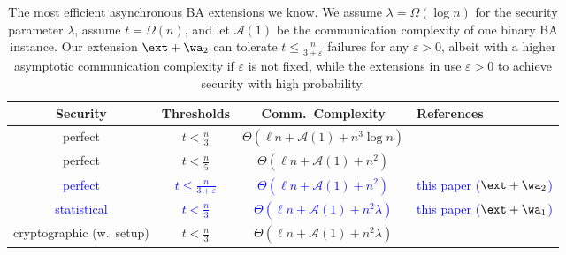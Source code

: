 \begin{table}[t] \begin{threeparttable}
    \setcellgapes{1pt}
    \caption{The most efficient asynchronous BA extensions we know. We assume $\lambda = \Omega(\log n)$ for the security parameter $\lambda$, assume $t = \Omega(n)$, and let $\mathcal{A}(1)$ be the communication complexity of one binary BA instance. Our \linebreak extension $\ext + \wa_2$ can tolerate $t \leq \frac{n}{3 + \varepsilon}$ failures for any $\varepsilon > 0$, albeit with a higher asymptotic communication complexity if $\varepsilon$ is not fixed, while the extensions in \cite{blln23, ck23} use $\varepsilon > 0$ to achieve security with high probability.}
    \makegapedcells
    \begin{tabularx}{1\linewidth}{|c|c|c|Y|} \hline
        \textbf{Security} & \textbf{Thresholds} & \textbf{Comm.\ Complexity} & \textbf{References} \\ \hline
        
        perfect & $t < \frac{n}{3}$ & $\Theta(\ell n + \mathcal{A}(1) + n^3\log n)$ & \cite{chen25} \\ \hline
        
        perfect & $t < \frac{n}{5}$ & $\Theta(\ell n + \mathcal{A}(1) + n^2)$ & \cite{lichen21} \\ \hline 
        
        \textcolor{blue}{perfect} & \textcolor{blue}{$t \leq \frac{n}{3 + \varepsilon}$} & \textcolor{blue}{$\Theta(\ell n + \mathcal{A}(1) + n^2)$} & \textcolor{blue}{this paper ($\ext + \wa_2$)} \\ \hline
        
        \textcolor{blue}{statistical} & \textcolor{blue}{$t < \frac{n}{3}$} & \textcolor{blue}{$\Theta(\ell n + \mathcal{A}(1) + n^2\lambda)$} & \textcolor{blue}{this paper ($\ext + \wa_1$)} \\ \hline
        
        cryptographic (w.\ setup) & $t < \frac{n}{3}$ & $\Theta(\ell n + \mathcal{A}(1) + n^2\lambda)$ & \cite{nayak20} \\ \hline
        

\end{tabularx}
\end{threeparttable}
\end{table}
